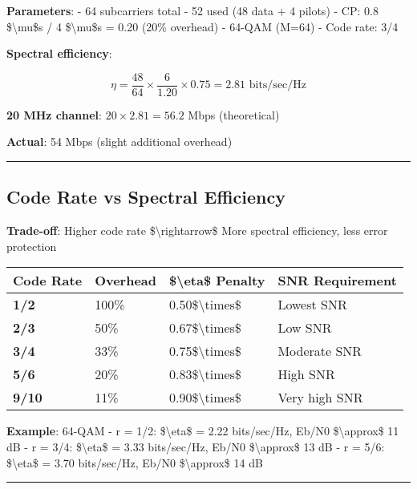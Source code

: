 \textbf{Parameters}: - 64 subcarriers total - 52 used (48 data + 4
pilots) - CP: 0.8 \$\textbackslash mu\$s / 4 \$\textbackslash mu\$s =
0.20 (20\% overhead) - 64-QAM (M=64) - Code rate: 3/4

\textbf{Spectral efficiency}:

\[
\eta = \frac{48}{64} \times \frac{6}{1.20} \times 0.75 = 2.81 \text{ bits/sec/Hz}
\]

\textbf{20 MHz channel}: \(20 \times 2.81 = 56.2\) Mbps (theoretical)

\textbf{Actual}: 54 Mbps (slight additional overhead)

\begin{center}\rule{0.5\linewidth}{0.5pt}\end{center}

\subsection{Code Rate vs Spectral
Efficiency}\label{code-rate-vs-spectral-efficiency}

\textbf{Trade-off}: Higher code rate \$\textbackslash rightarrow\$ More
spectral efficiency, less error protection

{\def\LTcaptype{} %
\begin{longtable}[]{@{}llll@{}}
\toprule\noalign{}
Code Rate & Overhead & \$\textbackslash eta\$ Penalty & SNR
Requirement \\
\midrule\noalign{}
\endhead
\bottomrule\noalign{}
\endlastfoot
\textbf{1/2} & 100\% & 0.50\$\textbackslash times\$ & Lowest SNR \\
\textbf{2/3} & 50\% & 0.67\$\textbackslash times\$ & Low SNR \\
\textbf{3/4} & 33\% & 0.75\$\textbackslash times\$ & Moderate SNR \\
\textbf{5/6} & 20\% & 0.83\$\textbackslash times\$ & High SNR \\
\textbf{9/10} & 11\% & 0.90\$\textbackslash times\$ & Very high SNR \\
\end{longtable}
}

\textbf{Example}: 64-QAM - r = 1/2: \$\textbackslash eta\$ = 2.22
bits/sec/Hz, Eb/N0 \$\textbackslash approx\$ 11 dB - r = 3/4:
\$\textbackslash eta\$ = 3.33 bits/sec/Hz, Eb/N0
\$\textbackslash approx\$ 13 dB - r = 5/6: \$\textbackslash eta\$ = 3.70
bits/sec/Hz, Eb/N0 \$\textbackslash approx\$ 14 dB

\begin{center}\rule{0.5\linewidth}{0.5pt}\end{center}

